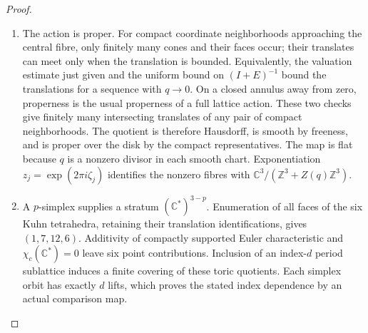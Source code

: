 \begin{proof}
\begin{enumerate}[label=\arabic*.]
\item The action is proper.  For compact coordinate neighborhoods approaching
the central fibre, only finitely many cones and their faces occur;
their translates can meet only when the translation is bounded.
Equivalently, the valuation estimate just given and the uniform bound
on $(I+E)^{-1}$ bound the translations for a sequence with $q\to0$.
On a closed annulus away from zero, properness is the usual
properness of a full lattice action.  These two checks give finitely
many intersecting translates of any pair of compact neighborhoods.
The quotient is therefore Hausdorff, is smooth by freeness, and is
proper over the disk by the compact representatives.  The map is flat
because $q$ is a nonzero divisor in each smooth chart.  Exponentiation
$z_j=\exp(2\pi i\zeta_j)$ identifies the nonzero fibres with
$\mathbb C^3/(\mathbb Z^3+Z(q)\mathbb Z^3)$.

\item A $p$-simplex supplies a stratum $(\mathbb C^*)^{3-p}$.
Enumeration of all faces of the six Kuhn tetrahedra, retaining their
translation identifications, gives $(1,7,12,6)$.
Additivity of compactly supported Euler characteristic and
$\chi_c(\mathbb C^*)=0$ leave six point contributions.
Inclusion of an index-$d$ period sublattice induces a finite covering
of these toric quotients.  Each simplex orbit has exactly $d$ lifts,
which proves the stated index dependence by an actual comparison map.

\end{enumerate}
\end{proof}




